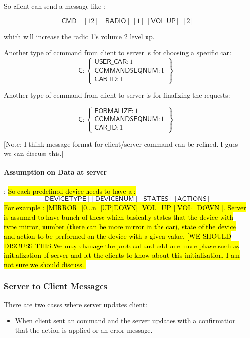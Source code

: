 So client can send a message like :

\[ [\textsf{CMD}]\;[12]\;[\textsf{RADIO}]\;[1]\;[\textsf{VOL\_UP}]\;[2]\]

which will increase the radio 1's volume 2 level up.

Another type of command from client to server is for choosing a specific car:
\[
\textsf{C}: \left\{ \begin{array}{ll}  \textsf{USER\_CAR}:1\\
                                      \textsf{COMMANDSEQNUM}:1\\
                                      \textsf{CAR\_ID}:1

           \end{array} \right\}
\]                                        

Another type of command from client to server is for finalizing the requests:

\[
\textsf{C}: \left\{ \begin{array}{ll}  \textsf{FORMALIZE}:1\\
                                      \textsf{COMMANDSEQNUM}:1\\
                                      \textsf{CAR\_ID}:1

           \end{array} \right\}
\]      

[Note: I think message format for client/server command can be refined. I gues we can discuss this.]


\paragraph{Assumption on Data at server}:  \hl{So each predefined device needs to have a :}
\[  [\textsf{DEVICETYPE}] [\textsf{DEVICENUM}] [\textsf{STATES}] [\textsf{ACTIONS}]\]
\hl{
For example : [MIRROR] [0$\ldots$n] [UP$\mid$DOWN] [VOL\_UP $\mid$ VOL\_DOWN ]. Server is assumed to have bunch of these which basically states that the device with type mirror, number (there can be more mirror in the car), state of the device and action to be performed on the device with a given value. [WE SHOULD DISCUSS THIS.We may chanage the protocol and add one more phase such as  initialization of server and let the clients to know about this initialization. I am not sure we should discuss.]}

\subsubsection{Server to Client Messages}
\label{sec:pdus:pdu:s_to_c}
There are two cases where server updates client:
\begin{itemize}
\item When client sent an command and the server updates with a confirmation that the action is applied or an error message.
  \end{itemize}

